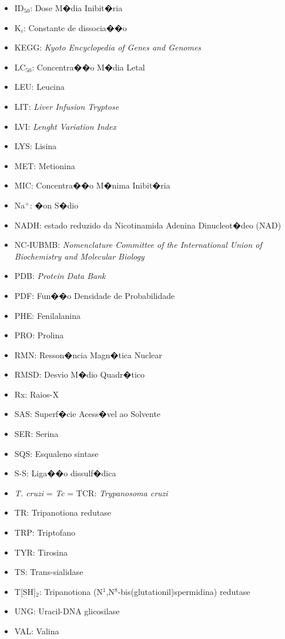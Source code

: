 {{\begin{itemize}
\item ID$_{50}$: Dose M�dia Inibit�ria
\item K$_i$: Constante de dissocia��o
\item KEGG: {\it Kyoto Encyclopedia of Genes and Genomes}
\item LC$_{50}$: Concentra��o M�dia Letal
\item LEU: Leucina
\item LIT: {\it Liver Infusion Tryptose}
\item LVI: {\it Lenght Variation Index}
\item LYS: Lisina
\item MET: Metionina
\item MIC: Concentra��o M�nima Inibit�ria
\item Na$^+$: �on S�dio
\item NADH: estado reduzido da Nicotinamida Adenina Dinucleot�deo (NAD)
\item NC-IUBMB: {\it Nomenclature Committee
	 of the International Union of Biochemistry and Molecular
	 Biology} 
\item PDB: {\it Protein Data Bank}
\item PDF: Fun��o Densidade de Probabilidade
\item PHE: Fenilalanina
\item PRO: Prolina
\item RMN: Resson�ncia Magn�tica Nuclear
\item RMSD: Desvio M�dio Quadr�tico
\item Rx: Raios-X
\item SAS: Superf�cie Acess�vel ao Solvente
\item SER: Serina
\item SQS: Esqualeno sintase
\item S-S: Liga��o dissulf�dica
\item {\it T. cruzi} = {\it Tc} = TCR: {\it Trypanosoma cruzi}
\item TR: Tripanotiona redutase
\item TRP: Triptofano
\item TYR: Tirosina
\item TS: Trans-sialidase
\item T[SH]$_2$: Tripanotiona (N$^1$,N$^8$-bis(glutationil)spermidina) redutase
\item UNG: Uracil-DNA glicosilase
\item VAL: Valina
\end{itemize}
}
}
